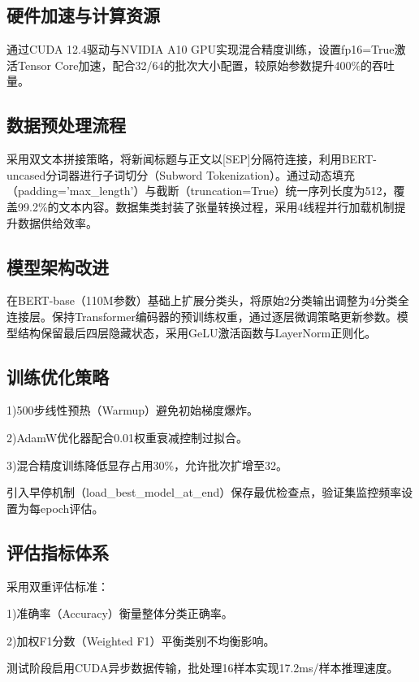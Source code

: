 \documentclass{cjc}
\begin{document}
\subsection{硬件加速与计算资源}

通过CUDA 12.4驱动与NVIDIA A10 GPU实现混合精度训练，设置fp16=True激活Tensor Core加速，配合32/64的批次大小配置，较原始参数提升400\%的吞吐量。

\subsection{数据预处理流程}

采用双文本拼接策略，将新闻标题与正文以[SEP]分隔符连接，利用BERT-uncased分词器进行子词切分（Subword Tokenization）。通过动态填充（padding='max\_length'）与截断（truncation=True）统一序列长度为512，覆盖99.2\%的文本内容。数据集类封装了张量转换过程，采用4线程并行加载机制提升数据供给效率。

\subsection{模型架构改进}

在BERT-base（110M参数）基础上扩展分类头，将原始2分类输出调整为4分类全连接层。保持Transformer编码器的预训练权重，通过逐层微调策略更新参数。模型结构保留最后四层隐藏状态，采用GeLU激活函数与LayerNorm正则化。

\subsection{训练优化策略}

1)500步线性预热（Warmup）避免初始梯度爆炸。

2)AdamW优化器配合0.01权重衰减控制过拟合。

3)混合精度训练降低显存占用30\%，允许批次扩增至32。

引入早停机制（load\_best\_model\_at\_end）保存最优检查点，验证集监控频率设置为每epoch评估。

\subsection{评估指标体系}

采用双重评估标准：

1)准确率（Accuracy）衡量整体分类正确率。

2)加权F1分数（Weighted F1）平衡类别不均衡影响。

测试阶段启用CUDA异步数据传输，批处理16样本实现17.2ms/样本推理速度。
\end{document}
